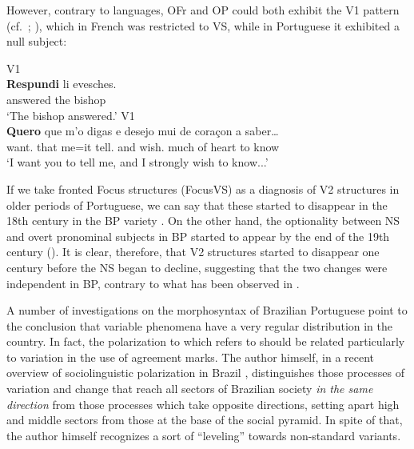 \documentclass[output=paper]{langsci/langscibook}
\begin{document}
However, contrary to  languages, \gls{OFr} and OP could both exhibit
the V1 pattern (cf.\ \citealt{Kaiser1999}; \citealt{Ribeiro1995}), which in
French was restricted to VS, while in Portuguese it exhibited a null subject:

\ea\label{ex:key:26.4}
\ea     {} V1\\
    \gll    \textbf{Respundi} li evesches.\\
            answered the bishop\\
    \glt    \enquote*{The bishop answered.}
    \ex     {} V1\\
    \gll    \textbf{Quero} que m’o     digas        e     desejo mui   de coraçon a saber\dots{}\\
            want.\Fsg{} that  me=it tell.\Ssg{} and wish.\Fsg{} much of heart      to know\\
    \glt    \enquote*{I want you to tell me, and I  strongly wish to know...}
    \z
\z

If we take fronted Focus structures (FocusVS) as a diagnosis of V2 structures
in older periods of Portuguese, we can say that these started to disappear in
the 18th century in the \gls{BP} variety
\parencite{KatoRibeiro2009}. On the other hand, the optionality between NS and
overt pronominal subjects in \gls{BP} started to
appear by the end of the 19th century (\citealt{Tarallo1985,Duarte1993}). It is
clear, therefore, that V2 structures started to disappear one century before
the NS began to decline, suggesting that the two changes were independent in
\gls{BP}, contrary to what has been observed in
.

A number of investigations on the morphosyntax of Brazilian Portuguese point to
the conclusion that variable phenomena have a very regular distribution in the
country. In fact, the polarization to which \citet{Lucchesi2009b} refers to
should be related particularly to variation in the use of agreement marks. The
author himself, in a recent overview of sociolinguistic polarization in Brazil
\parencite{Lucchesi2015}, distinguishes those processes of variation and change
that reach all sectors of Brazilian society \emph{in the same direction} from
those processes which take opposite directions, setting apart high and middle
sectors from those at the base of the social pyramid. In spite of that, the
author himself recognizes a sort of “leveling” towards non-standard variants.
\end{document}
